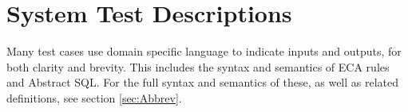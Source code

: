 \documentclass[12pt]{report}
\begin{document}
\chapter{System Test Descriptions}\label{ch:SystemTests}
\newcommand{\us}{\textunderscore}
\newcommand{\tabb}{\hspace{35pt}}
\setcounter{sysTestNum}{1}

\newcommand{\ECAIns}[2]{\mathbf{Ins}(#1,#2)}
\newcommand{\ECADel}[2]{\mathbf{Del}(#1,#2)}
\newcommand{\ECAInsDel}[2]{\mathbf{\{Ins/Del\}}(#1,#2)}
\newcommand{\ECADelIns}[2]{\mathbf{\{Del/Ins\}}(#1,#2)}
\newcommand{\ECAOn}{\mathbf{On~}}
\newcommand{\ECADo}{\ECASpacer\mathbf{Do~}}
\newcommand{\ECANop}{\mathbf{Nop~}}
\newcommand{\ECASpacer}{\,\,\,\,}
\newcommand{\IRel}[1]{\mathbb{I}_{#1}}
\newcommand{\VRel}[2]{\mathbb{V}_{#1\times#2}}

\newcommand{\systemTest}[5]{
\section*{T\arabic{sysTestNum}~~~ #2}\label{sec:#1}
\addcontentsline{toc}{section}{T\arabic{sysTestNum}~~~ #2}
\stepcounter{sysTestNum}
\hspace{-6pt}\begin{tabular}{p{3cm}l}
\textbf{Test type}     &   #3 \\ 
\textbf{Schedule}      &   #4 \\
\textbf{Requirements}  &   #5 \\
\end{tabular}
}


Many test cases use domain specific language to indicate inputs and outputs, for
both clarity and brevity. This includes the syntax and semantics of ECA rules
and Abstract SQL. For the full syntax and semantics of these, as well as
related definitions, see section \ref{sec:Abbrev}.


\end{document}
